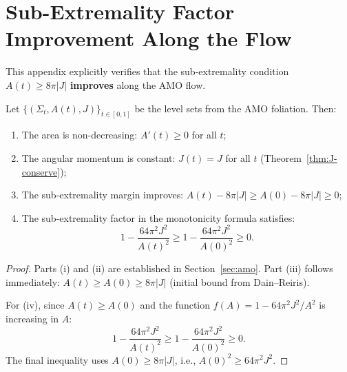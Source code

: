 \section{Sub-Extremality Factor Improvement Along the Flow}\label{app:subext-improvement}

This appendix explicitly verifies that the sub-extremality condition $A(t) \geq 8\pi|J|$ \textbf{improves} along the AMO flow.

\begin{proposition}\label{prop:subext-improve}
Let $\{(\Sigma_t, A(t), J)\}_{t \in [0,1]}$ be the level sets from the AMO foliation. Then:
\begin{enumerate}[label=\textup{(\roman*)}]
    \item The area is non-decreasing: $A'(t) \geq 0$ for all $t$;
    \item The angular momentum is constant: $J(t) = J$ for all $t$ (Theorem~\ref{thm:J-conserve});
    \item The sub-extremality margin improves: $A(t) - 8\pi|J| \geq A(0) - 8\pi|J| \geq 0$;
    \item The sub-extremality factor in the monotonicity formula satisfies:
    \[
    1 - \frac{64\pi^2 J^2}{A(t)^2} \geq 1 - \frac{64\pi^2 J^2}{A(0)^2} \geq 0.
    \]
\end{enumerate}
\end{proposition}

\begin{proof}
Parts (i) and (ii) are established in Section~\ref{sec:amo}. Part (iii) follows immediately: $A(t) \geq A(0) \geq 8\pi|J|$ (initial bound from Dain--Reiris).

For (iv), since $A(t) \geq A(0)$ and the function $f(A) = 1 - 64\pi^2 J^2/A^2$ is increasing in $A$:
\[
1 - \frac{64\pi^2 J^2}{A(t)^2} \geq 1 - \frac{64\pi^2 J^2}{A(0)^2} \geq 0.
\]
The final inequality uses $A(0) \geq 8\pi|J|$, i.e., $A(0)^2 \geq 64\pi^2 J^2$.
\end{proof}

